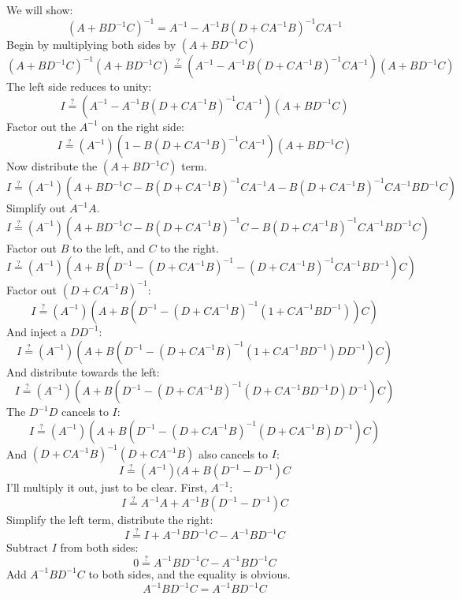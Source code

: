 \documentclass[11pt]{report}
\begin{document}
We will show:
\[ (A + BD^{-1}C)^{-1} = A^{-1} - A^{-1}B(D + CA^{-1}B)^{-1}CA^{-1} \]
Begin by multiplying both sides by $(A + BD^{-1}C)$
\[ (A + BD^{-1}C)^{-1}(A + BD^{-1}C) \overset{?}{=} (A^{-1} - A^{-1}B(D + CA^{-1}B)^{-1}CA^{-1})(A + BD^{-1}C) \]
The left side reduces to unity:
\[ I \overset{?}{=} (A^{-1} - A^{-1}B(D + CA^{-1}B)^{-1}CA^{-1})(A + BD^{-1}C) \]
Factor out the $A^{-1}$ on the right side:
\[ I \overset{?}{=} (A^{-1})
  (1 - B(D + CA^{-1}B)^{-1}CA^{-1})
  (A + BD^{-1}C)
\]
Now distribute the $(A + BD^{-1}C)$ term.
\[ I \overset{?}{=} (A^{-1})(
  A + BD^{-1}C
  - B(D + CA^{-1}B)^{-1}CA^{-1}A
  - B(D + CA^{-1}B)^{-1}CA^{-1}BD^{-1}C
)\]
Simplify out $A^{-1}A$.
\[ I \overset{?}{=} (A^{-1})(
  A + BD^{-1}C
  - B(D + CA^{-1}B)^{-1}C
  - B(D + CA^{-1}B)^{-1}CA^{-1}BD^{-1}C
)\]
Factor out $B$ to the left, and $C$ to the right.
\[ I \overset{?}{=} (A^{-1})(
  A + B(
      D^{-1}
      - (D + CA^{-1}B)^{-1}
      - (D + CA^{-1}B)^{-1}CA^{-1}BD^{-1}
      )C
)\]
Factor out $(D + CA^{-1}B)^{-1}$:
\[ I \overset{?}{=} (A^{-1})(
  A + B(
      D^{-1}
      - (D + CA^{-1}B)^{-1}
        (1 + CA^{-1}BD^{-1})
      )C
)\]
And inject a $DD^{-1}$:
\[ I \overset{?}{=} (A^{-1})(
  A + B(
      D^{-1}
      - (D + CA^{-1}B)^{-1}
        (1 + CA^{-1}BD^{-1})DD^{-1}
      )C
)\]
And distribute towards the left:
\[ I \overset{?}{=} (A^{-1})(
  A + B(
      D^{-1}
      - (D + CA^{-1}B)^{-1}
        (D + CA^{-1}BD^{-1}D)D^{-1}
      )C
)\]
The $D^{-1}D$ cancels to $I$:
\[ I \overset{?}{=} (A^{-1})(
  A + B(
      D^{-1}
      - (D + CA^{-1}B)^{-1}
        (D + CA^{-1}B)D^{-1}
      )C
)\]
And $(D + CA^{-1}B)^{-1}(D + CA^{-1}B)$ also cancels to $I$:
\[ I \overset{?}{=}
  (A^{-1})(A + B(D^{-1} - D^{-1})C
\]
I'll multiply it out, just to be clear. First, $A^{-1}$:
\[ I \overset{?}{=}
  A^{-1}A + A^{-1}B(D^{-1} - D^{-1})C
\]
Simplify the left term, distribute the right:
\[ I \overset{?}{=}
  I + A^{-1}BD^{-1}C - A^{-1}BD^{-1}C
\]
Subtract $I$ from both sides:
\[ 0 \overset{?}{=}
  A^{-1}BD^{-1}C - A^{-1}BD^{-1}C
\]
Add $A^{-1}BD^{-1}C$ to both sides, and the equality is obvious.
\[ A^{-1}BD^{-1}C = A^{-1}BD^{-1}C \]





\end{document}
